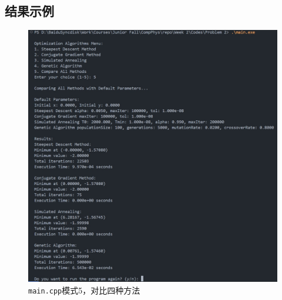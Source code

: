 \subsection{结果示例}
\begin{figure}[H]
    \centering
    \includegraphics[width=1.0\textwidth]{Problem_2/Figs/2_all.png}
    \caption{\texttt{main.cpp}模式5，对比四种方法}
    \label{fig:2_cpp_all}
\end{figure}
